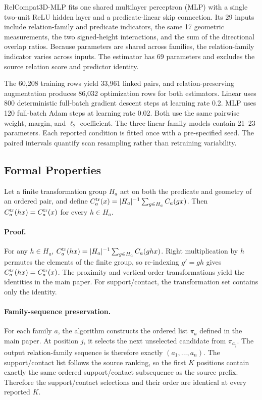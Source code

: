 RelCompat3D-MLP fits one shared multilayer perceptron (MLP) with a single two-unit ReLU hidden layer and a predicate-linear skip connection. Its 29 inputs include relation-family and predicate indicators, the same 17 geometric measurements, the two signed-height interactions, and the sum of the directional overlap ratios. Because parameters are shared across families, the relation-family indicator varies across inputs. The estimator has 69 parameters and excludes the source relation score and predictor identity.

The 60,208 training rows yield 33,961 linked pairs, and relation-preserving augmentation produces 86,032 optimization rows for both estimators. Linear uses 800 deterministic full-batch gradient descent steps at learning rate 0.2. MLP uses 120 full-batch Adam steps at learning rate 0.02. Both use the same pairwise weight, margin, and $\ell_2$ coefficient. The three linear family models contain 21--23 parameters. Each reported condition is fitted once with a pre-specified seed. The paired intervals quantify scan resampling rather than retraining variability.

\subsection{Formal Properties}

\begin{proposition}
Let a finite transformation group $H_a$ act on both the predicate and geometry of an ordered pair, and define $C_a^{\rm tr}(x)=|H_a|^{-1}\sum_{g\in H_a}C_a(gx)$. Then $C_a^{\rm tr}(hx)=C_a^{\rm tr}(x)$ for every $h\in H_a$.
\end{proposition}

\paragraph{Proof.}
For any $h\in H_a$,
\(
C_a^{\rm tr}(hx)=|H_a|^{-1}\sum_{g\in H_a}C_a(ghx)
\).
Right multiplication by $h$ permutes the elements of the finite group, so re-indexing $g'=gh$ gives $C_a^{\rm tr}(hx)=C_a^{\rm tr}(x)$. The proximity and vertical-order transformations yield the identities in the main paper. For support/contact, the transformation set contains only the identity.

\paragraph{Family-sequence preservation.}
For each family $a$, the algorithm constructs the ordered list $\pi_a$ defined in the main paper. At position $j$, it selects the next unselected candidate from $\pi_{a_j}$. The output relation-family sequence is therefore exactly $(a_1,\ldots,a_n)$. The support/contact list follows the source ranking, so the first $K$ positions contain exactly the same ordered support/contact subsequence as the source prefix. Therefore the support/contact selections and their order are identical at every reported $K$.

